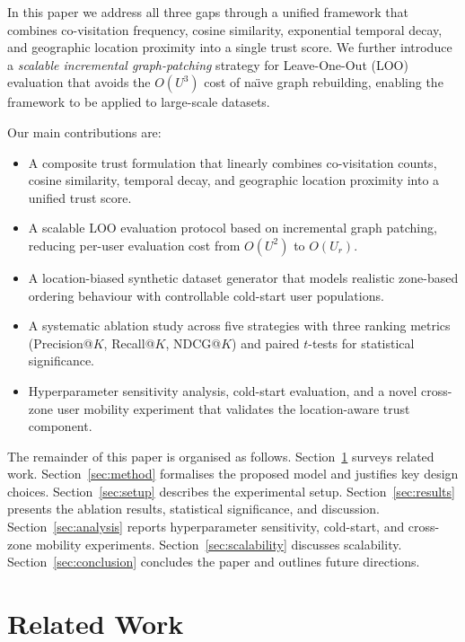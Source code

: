 \documentclass[conference]{IEEEtran}
\begin{document}
In this paper we address all three gaps through a unified framework that
combines co-visitation frequency, cosine similarity, exponential
temporal decay, and geographic location proximity into a single trust
score.  We further introduce a
\emph{scalable incremental graph-patching} strategy for Leave-One-Out
(LOO) evaluation that avoids the $O(U^3)$ cost of na\"{\i}ve graph
rebuilding, enabling the framework to be applied to large-scale datasets.

Our main contributions are:
\begin{itemize}
  \item A composite trust formulation that linearly combines co-visitation
        counts, cosine similarity, temporal decay, and geographic location
        proximity into a unified trust score.
  \item A scalable LOO evaluation protocol based on incremental graph
        patching, reducing per-user evaluation cost from $O(U^2)$ to
        $O(U_r)$.
  \item A location-biased synthetic dataset generator that models
        realistic zone-based ordering behaviour with controllable
        cold-start user populations.
  \item A systematic ablation study across five strategies with three
        ranking metrics (Precision@$K$, Recall@$K$, NDCG@$K$) and paired
        $t$-tests for statistical significance.
  \item Hyperparameter sensitivity analysis, cold-start evaluation, and a
        novel cross-zone user mobility experiment that validates the
        location-aware trust component.
\end{itemize}

The remainder of this paper is organised as follows.
Section~\ref{sec:related} surveys related work.
Section~\ref{sec:method} formalises the proposed model and justifies key
design choices.
Section~\ref{sec:setup} describes the experimental setup.
Section~\ref{sec:results} presents the ablation results, statistical
significance, and discussion.
Section~\ref{sec:analysis} reports hyperparameter sensitivity, cold-start,
and cross-zone mobility experiments.
Section~\ref{sec:scalability} discusses scalability.
Section~\ref{sec:conclusion} concludes the paper and outlines future
directions.


\section{Related Work}
\label{sec:related}
\end{document}
